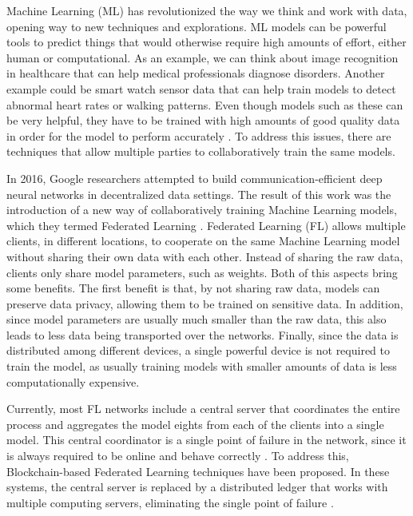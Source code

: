 Machine Learning (ML) has revolutionized the way we think and work with data, opening way to new techniques and explorations. ML models can be powerful tools to predict things that would otherwise require high amounts of effort, either human or computational. As an example, we can think about image recognition in healthcare that can help medical professionals diagnose disorders. Another example could be smart watch sensor data that can help train models to detect abnormal heart rates or walking patterns. Even though models such as these can be very helpful, they have to be trained with high amounts of good quality data in order for the model to perform accurately \cite{10.1145/3394486.3406477}. To address this issues, there are techniques that allow multiple parties to collaboratively train the same models.

In 2016, Google researchers attempted to build communication-efficient deep neural networks in decentralized data settings. The result of this work was the introduction of a new way of collaboratively training Machine Learning models, which they termed Federated Learning \cite{10.48550/arxiv.1602.05629}. Federated Learning (FL) allows multiple clients, in different locations, to cooperate on the same Machine Learning model without sharing their own data with each other. Instead of sharing the raw data, clients only share model parameters, such as weights. Both of this aspects bring some benefits. The first benefit is that, by not sharing raw data, models can preserve data privacy, allowing them to be trained on sensitive data. In addition, since model parameters are usually much smaller than the raw data, this also leads to less data being transported over the networks. Finally, since the data is distributed among different devices, a single powerful device is not required to train the model, as usually training models with smaller amounts of data is less computationally expensive.

Currently, most FL networks include a central server that coordinates the entire process and aggregates the model eights from each of the clients into a single model. This central coordinator is a single point of failure in the network, since it is always required to be online and behave correctly \cite{li_blockchain_2021, 10.48550/arxiv.2110.02182}. To address this, Blockchain-based Federated Learning techniques have been proposed. In these systems, the central server is replaced by a distributed ledger that works with multiple computing servers, eliminating the single point of failure \cite{10.48550/arxiv.2009.09338, 9403374}.

